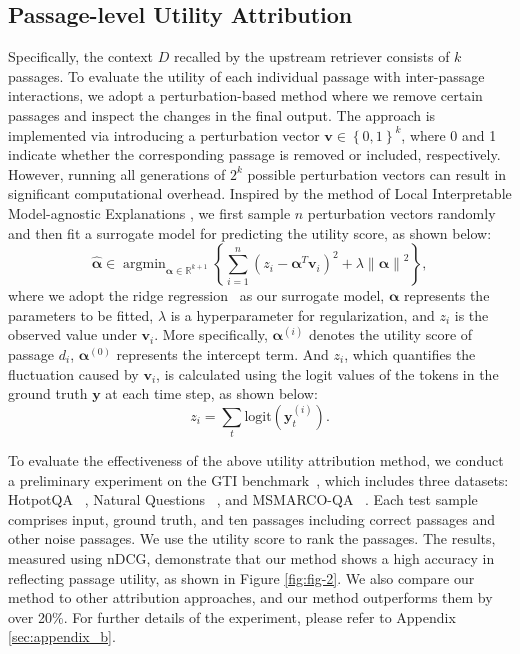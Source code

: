 \documentclass[11pt]{article}
\begin{document}
\subsection{Passage-level Utility Attribution}
\label{sec:3-3}


Specifically, the context $D$ recalled by the upstream retriever consists of $k$ passages. To evaluate the utility of each individual passage with inter-passage interactions, we adopt a perturbation-based method where we remove certain passages and inspect the changes in the final output. The approach is implemented via introducing a perturbation vector $\mathbf{v} \in \left \{ 0,1 \right \}^{k}$, where 0 and 1 indicate whether the corresponding passage is removed or included, respectively. However, running all generations of $2^{k}$ possible perturbation vectors can result in significant computational overhead. Inspired by the method of Local Interpretable Model-agnostic Explanations \citep[LIME;][]{lime, ananalysisoflimefortextdata}, we first sample $n$ perturbation vectors randomly and then fit a surrogate model for predicting the utility score, as shown below:
\begin{equation}
    \hat{\bm{\alpha} }  \in \mathop{\arg \min}_{\bm{\alpha} \in \mathbb{R}^{k + 1} } \left \{ \sum_{i=1}^{n} \left ( z_i-\bm{\alpha}^T \mathbf{v}_i  \right )^2 + \lambda \left \| \bm{\alpha}  \right \|^2  \right \},
\end{equation}
where we adopt the ridge regression~\citep{Hilt1977RidgeAC} as our surrogate model, $\bm{\alpha}$ represents the parameters to be fitted, $\lambda$ is a hyperparameter for regularization, and $z_i$ is the observed value under $\mathbf{v}_i$. More specifically, $\bm{\alpha}^{(i)}$ denotes the utility score of passage $d_i$, $\bm{\alpha}^{(0)}$ represents the intercept term. And $z_i$, which quantifies the fluctuation caused by $\mathbf{v}_i$, is calculated using the logit values of the tokens in the ground truth $\mathbf{y}$ at each time step, as shown below:
\begin{equation}
    z_i =  \sum_{t} \mathrm{logit} \left ( \mathbf{y}^{\left ( i \right ) }_t \right ).
\end{equation}

To evaluate the effectiveness of the above utility attribution method, we conduct a preliminary experiment on the GTI benchmark~\citep{arellmgoodatutilityjudgements}, which includes three datasets: HotpotQA ~\citep{yang-etal-2018-hotpotqa}, Natural Questions ~\citep[NQ;][]{kwiatkowski-etal-2019-nq}, and MSMARCO-QA ~\citep{msmarcoqa}. Each test sample comprises input, ground truth, and ten passages including correct passages and other noise passages. We use the utility score to rank the passages. The results, measured using nDCG, demonstrate that our method shows a high accuracy in reflecting passage utility, as shown in Figure \ref{fig:fig-2}. We also compare our method to other attribution approaches, and our method outperforms them by over 20\%. For further details of the experiment, please refer to Appendix \ref{sec:appendix_b}.
\end{document}
